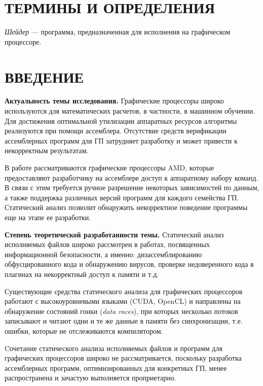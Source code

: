 \documentclass[a4paper,14pt]{extarticle}
\newcommand{\topic}[2]{\textbf{#1.} #2\newline}
\begin{document}
\tableofcontents
\newpage

\section*{ТЕРМИНЫ И ОПРЕДЕЛЕНИЯ}

\textit{Шейдер} — программа, предназначенная для исполнения на графическом процессоре.

\newpage

\section*{ВВЕДЕНИЕ}

\topic{Актуальность темы исследования}{Графические процессоры широко используются
для математических расчетов, в частности, в машинном обучении. Для достижения оптимальной
утилизации аппаратных ресурсов алгоритмы реализуются при помощи ассемблера.
Отсутствие средств верификации ассемблерных программ для ГП затрудняет разработку
и может привести к некорректным результатам.

В работе рассматриваются графические процессоры AMD, которые предоставляют разработчику
на ассемблере доступ к аппаратному набору команд. В связи с этим требуется ручное
разрешение некоторых зависимостей по данным, а также поддержка различных версий программ
для каждого семейства ГП. Статический анализ позволит обнаружить некорректное
поведение программы еще на этапе ее разработки.}

\topic{Степень теоретической разработанности темы}{Статический анализ исполняемых файлов
широко рассмотрен в работах, посвященных информационной безопасности, а именно:
дизассемблированию обфусцированного кода и обнаружению вирусов,
проверке недоверенного кода в плагинах на некорректный доступ к памяти и т.д.\cite{static-analysis-binary}

Существующие средства статического анализа для графических процессоров работают с
высокоуровневыми языками (CUDA, OpenCL) и направлены на обнаружение состояний
гонки (\textit{data races}), при которых несколько потоков записывают
и читают одни и те же данные в памяти без синхронизации, т.е. ошибки, которые
не отслеживаются компилятором\cite{gpu-static-verification}.

Cочетание статического анализа исполняемых файлов и программ для графических
процессоров широко не рассматривается, поскольку разработка ассемблерных программ,
оптимизированных для конкретных ГП, менее распространена и зачастую выполняется
проприетарно.}
\end{document}
